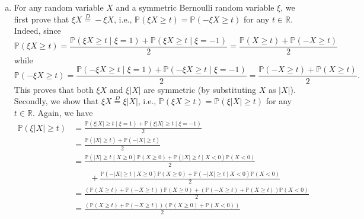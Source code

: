 \begin{answer}
	\begin{enumerate}[(a)]
		\item For any random variable \(X\) and a symmetric Bernoulli random variable \(\xi \), we first prove that \(\xi X \overset{D}{=} - \xi X\), i.e., \(\mathbb{P} (\xi X \geq t) = \mathbb{P} (- \xi X \geq t)\) for any \(t \in \mathbb{R} \). Indeed, since
		      \[
			      \mathbb{P} (\xi X \geq t)
			      = \frac{\mathbb{P} (\xi X \geq t \mid \xi = 1) + \mathbb{P} (\xi X \geq t \mid \xi = -1)}{2}
			      = \frac{\mathbb{P} (X \geq t) + \mathbb{P} (-X \geq t)}{2}
		      \]
		      while
		      \[
			      \mathbb{P} (- \xi X \geq t)
			      = \frac{\mathbb{P} (-\xi X \geq t \mid \xi = 1) + \mathbb{P} (-\xi X \geq t \mid \xi = -1)}{2}
			      = \frac{\mathbb{P} (-X \geq t) + \mathbb{P} (X \geq t)}{2}.
		      \]
		      This proves that both \(\xi X\) and \(\xi \lvert X \rvert \) are symmetric (by substituting \(X\) as \(\lvert X \rvert \)).  Secondly, we show that \(\xi X \overset{D}{=} \xi \lvert X \rvert \), i.e., \(\mathbb{P} (\xi X \geq t) = \mathbb{P} (\xi \lvert X \rvert \geq t)\) for any \(t \in \mathbb{R} \). Again, we have
		      \[
			      \begin{split}
				      \mathbb{P} (\xi \lvert X \rvert \geq t)
				       & = \frac{\mathbb{P} (\xi \lvert X \rvert \geq t \mid \xi = 1) + \mathbb{P} (\xi \lvert X \rvert \geq t \mid \xi = -1)}{2}                                           \\
				       & = \frac{\mathbb{P} (\lvert X \rvert \geq t) + \mathbb{P} (- \lvert X \rvert \geq t)}{2}                                                                            \\
				       & = \frac{\mathbb{P} (\lvert X \rvert \geq t \mid X \geq 0) \mathbb{P} (X \geq 0) + \mathbb{P} (\lvert X \rvert \geq t \mid X < 0) \mathbb{P} (X < 0) }{2}           \\
				       & \qquad + \frac{\mathbb{P} (- \lvert X \rvert \geq t \mid X \geq 0) \mathbb{P} (X \geq 0) + \mathbb{P} (- \lvert X \rvert \geq t \mid X < 0) \mathbb{P} (X < 0)}{2} \\
				       & = \frac{(\mathbb{P} (X \geq t) + \mathbb{P} (- X \geq t))\mathbb{P} (X \geq 0) + (\mathbb{P} (- X \geq t) + \mathbb{P} (X \geq t))\mathbb{P} (X < 0)}{2}           \\
				       & = \frac{(\mathbb{P} (X \geq t) + \mathbb{P} (-X \geq t)) (\mathbb{P} (X \geq 0) + \mathbb{P} (X < 0))}{2}                                                          \\

\end{split}\]
\end{enumerate}
\end{answer}

